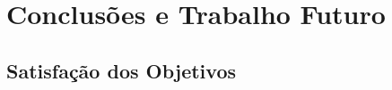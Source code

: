 \chapter{Conclusões e Trabalho Futuro} \label{chap:concl}

\section*{}



\section{Satisfação dos Objetivos}

